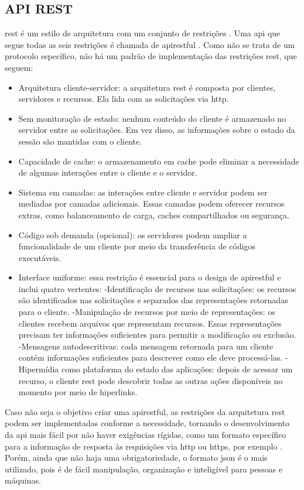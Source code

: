 \subsection{API REST}
\Gls{rest} é um estilo de arquitetura com um conjunto de restrições \cite{redhat_apirest}. Uma \ac{api} que segue todas as seis restrições é chamada de \gls{apirestful} \cite{royfielding}. Como não se trata de um protocolo específico, não há um padrão de implementação das restrições \ac{rest}, que seguem:
\begin{quoting}[rightmargin=0cm,leftmargin=4cm]
	\begin{SingleSpace}
		{\footnotesize 
			\begin{itemize}
				\item Arquitetura cliente-servidor: a arquitetura \ac{rest} é composta por clientes, servidores e recursos. Ela lida com as solicitações via \acs{http}.
				\item Sem monitoração de estado: nenhum conteúdo do cliente é armazenado no servidor entre as solicitações. Em vez disso, as informações sobre o estado da sessão são mantidas com o cliente.
				\item Capacidade de cache: o armazenamento em cache pode eliminar a necessidade de algumas interações entre o cliente e o servidor.
				\item Sistema em camadas: as interações entre cliente e servidor podem ser mediadas por camadas adicionais. Essas camadas podem oferecer recursos extras, como balanceamento de carga, caches compartilhados ou segurança.
				\item Código sob demanda (opcional): os servidores podem ampliar a funcionalidade de um cliente por meio da transferência de códigos executáveis.
				\item Interface uniforme: essa restrição é essencial para o design de \gls{apirestful} e inclui quatro vertentes:
				\subitem -Identificação de recursos nas solicitações: os recursos são identificados nas solicitações e separados das representações retornadas para o cliente.
				\subitem -Manipulação de recursos por meio de representações: os clientes recebem arquivos que representam recursos. Essas representações precisam ter informações suficientes para permitir a modificação ou exclusão.
				\subitem -Mensagens autodescritivas: cada mensagem retornada para um cliente contém informações suficientes para descrever como ele deve processá-las.
				\subitem -Hipermídia como plataforma do estado das aplicações: depois de acessar um recurso, o cliente \ac{rest} pode descobrir todas as outras ações disponíveis no momento por meio de hiperlinks. \cite{redhat_api}
			\end{itemize}
			}
	\end{SingleSpace}
\end{quoting}
Caso não seja o objetivo criar uma \gls{apirestful}, as restrições da arquitetura \ac{rest} podem ser implementadas conforme a necessidade, tornando o desenvolvimento da \ac{api} mais fácil por não haver exigências rígidas, como um formato específico para a informação de resposta às requisições via \ac{http} ou \ac{https}, por exemplo \cite{redhat_apirest}. Porém, ainda que não haja uma obrigatoriedade, o formato \ac{json} é o mais utilizado, pois é de fácil manipulação, organização e inteligível para pessoas e máquinas.